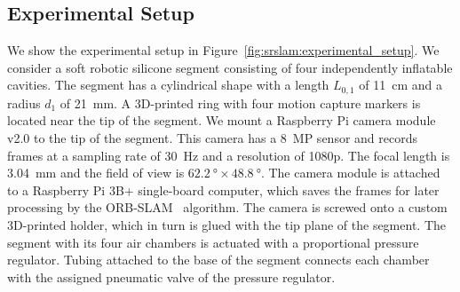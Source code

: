 \subsection{Experimental Setup}
We show the experimental setup in Figure~\ref{fig:srslam:experimental_setup}.
We consider a soft robotic silicone segment consisting of four independently inflatable cavities. The segment has a cylindrical shape with a length $L_{0,1}$ of \SI{11}{cm} and a radius $d_1$ of \SI{21}{mm}. 
A 3D-printed ring with four motion capture markers is located near the tip of the segment.
%
We mount a Raspberry Pi camera module v2.0 to the tip of the segment.
This camera has a \SI{8}{MP} sensor and records frames at a sampling rate of \SI{30}{Hz} and a resolution of 1080p.
The focal length is \SI{3.04}{mm} and the field of view is $\SI{62.2}{\degree} \times \SI{48.8}{\degree}$.
The camera module is attached to a Raspberry Pi 3B+ single-board computer, which saves the frames for later processing by the ORB-SLAM~\citep{mur2017orb} algorithm.
The camera is screwed onto a custom 3D-printed holder, which in turn is glued with the tip plane of the segment.
%
The segment with its four air chambers is actuated with a proportional pressure regulator.
Tubing attached to the base of the segment connects each chamber with the assigned pneumatic valve of the pressure regulator.
%
